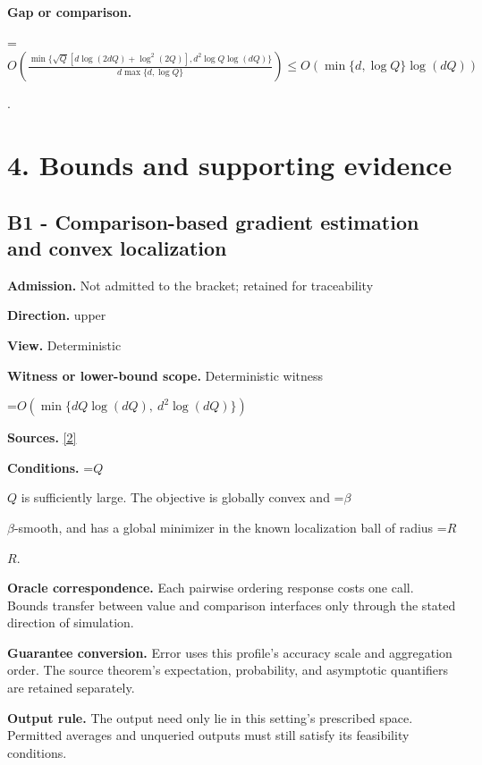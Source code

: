 \documentclass[10pt,a4paper]{article}
\newcommand{\AtlasMath}[1]{\par\begingroup\centering\setbox0=\hbox{$\displaystyle #1$}\ifdim\wd0>1.4\linewidth\typeout{ATLAS WIDE FORMULA: \the\wd0}\fi\ifdim\wd0>\linewidth\resizebox{\linewidth}{!}{\box0}\else\box0\fi\par\endgroup}
\newcommand{\AtlasInlineMath}[1]{\begingroup\setbox0=\hbox{$#1$}\ifdim\wd0>.4\linewidth\endgroup\AtlasMath{#1}\else\endgroup$#1$\fi}
\begin{document}
\textbf{Gap or comparison.}
\AtlasMath{O\!\left(\frac{\min\{\sqrt Q[d\log(2dQ)+\log^2(2Q)],d^2\log Q\log(dQ)\}}{d\max\{d,\log Q\}}\right)\le O(\min\{d,\log Q\}\log(dQ))}
.



\section{4. Bounds and supporting evidence}


\subsection{B1 - Comparison-based gradient estimation and convex localization}


\textbf{Admission.} Not admitted to the bracket; retained for traceability



\textbf{Direction.} upper



\textbf{View.} Deterministic



\textbf{Witness or lower-bound scope.} Deterministic witness



\AtlasMath{O\!\left(\min\{dQ\log(dQ),\ d^2\log(dQ)\}\right)}


\textbf{Sources.} \href{https://arxiv.org/html/2405.11454v1}{[2]}



\textbf{Conditions.} \AtlasInlineMath{Q} is sufficiently large. The objective is globally convex and \AtlasInlineMath{\beta}-smooth, and has a global minimizer in the known localization ball of radius \AtlasInlineMath{R}.



\textbf{Oracle correspondence.} Each pairwise ordering response costs one call. Bounds transfer between value and comparison interfaces only through the stated direction of simulation.



\textbf{Guarantee conversion.} Error uses this profile's accuracy scale and aggregation order. The source theorem's expectation, probability, and asymptotic quantifiers are retained separately.



\textbf{Output rule.} The output need only lie in this setting's prescribed space. Permitted averages and unqueried outputs must still satisfy its feasibility conditions.
\end{document}
